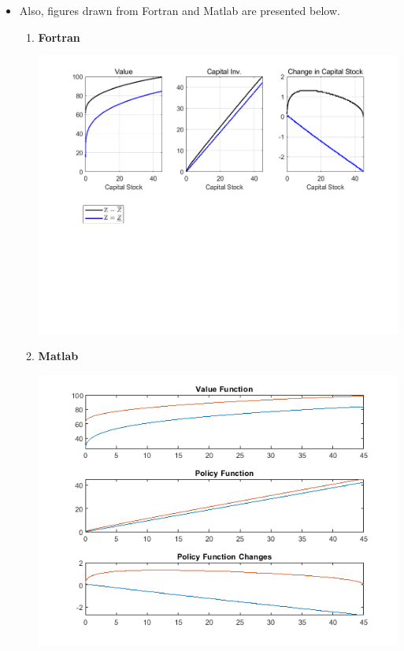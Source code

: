 \documentclass[11pt]{article}
\theoremstyle{definition}
\theoremstyle{definition}
\theoremstyle{definition}
\theoremstyle{definition}
\theoremstyle{definition}
\theoremstyle{definition}
\begin{document}
\begin{itemize}
\item Also, figures drawn from Fortran and Matlab are presented below.
\begin{enumerate}
	\item \textbf{Fortran}
	\begin{center}
		\includegraphics[width=1\linewidth]{./fortran/figure_fortran.png}
	\end{center}
	\item \textbf{Matlab}
	\begin{center}
		\includegraphics[width=1\linewidth]{./matlab/figure_matlab.png}
	\end{center} 
\end{enumerate}
\end{itemize}

	
\end{document}
